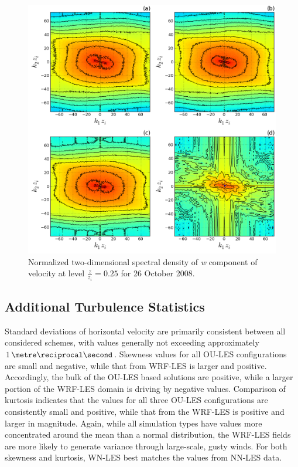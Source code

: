 \begin{figure}[H]
\begin{center}
\includegraphics[width=\textwidth]{figures/chapter6/spectra2D_w_20081026}
\end{center}
\caption{Normalized two-dimensional spectral density of \textit{w} component of velocity at level $\frac{z}{z_i}=0.25$ for 26 October 2008.}
\label{figure623}
\end{figure}


\subsection{Additional Turbulence Statistics}
\label{turb-stats-635}

Standard deviations of horizontal velocity are primarily consistent between all considered schemes, with values generally not exceeding approximately $1\, \metre\reciprocal\second$. Skewness values for all OU-LES configurations are small and negative, while that from WRF-LES is larger and positive. Accordingly, the bulk of the OU-LES based solutions are positive, while a larger portion of the WRF-LES domain is driving by negative values. Comparison of kurtosis indicates that the values for all three OU-LES configurations are consistently small and positive, while that from the WRF-LES is positive and larger in magnitude. Again, while all simulation types have values more concentrated around the mean than a normal distribution, the WRF-LES fields are more likely to generate variance through large-scale, gusty winds. For both skewness and kurtosis, WN-LES best matches the values from NN-LES data.

